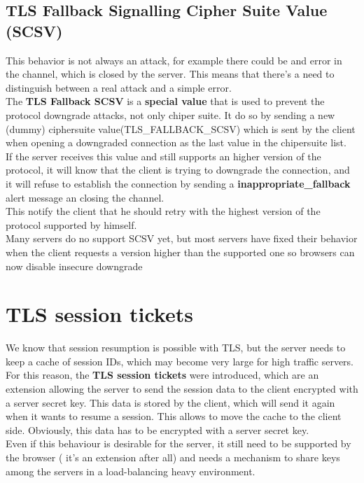 \subsection{TLS Fallback Signalling Cipher Suite Value (SCSV)}
This behavior is not always an attack, for example there could be and
error in the channel, which is closed by the server. This means that
there's a need to distinguish between a real attack and a simple 
error.\\
The \textbf{TLS Fallback SCSV} is a \textbf{special value} that is
used to prevent the protocol downgrade attacks, not only chiper suite.
It do so by sending a new (dummy) ciphersuite
value(TLS\_FALLBACK\_SCSV) which is sent by the client when opening a
downgraded connection as the last value in the chipersuite list.\\
If the server receives this value and still supports an higher version
of the protocol, it will know that the client is trying to downgrade
the connection, and it will refuse to establish the connection by
sending a \textbf{inappropriate\_fallback} alert message an closing
the channel.\\
This notify the client that he should retry with the highest version 
of the protocol supported by himself.\\
Many servers do no support SCSV yet, but most servers have fixed their
behavior when the client requests a version higher than the supported
one so browsers can now disable insecure downgrade

\section{TLS session tickets}
We know that session resumption is possible with TLS, but the server
needs to keep a cache of session IDs, which may become very large for
high traffic servers. For this reason, the \textbf{TLS session
tickets} were introduced, which are an extension allowing the server
to send the session data to the client encrypted with a server secret
key. This data is stored by the client, which will send it again when
it wants to resume a session. This allows to move the cache to the
client side. Obviously, this data has to be encrypted with a server
secret key.\\
Even if this behaviour is desirable for the server, it still need to
be supported by the browser ( it's an extension after all) and needs a
mechanism to share keys among the servers in a load-balancing heavy
environment.
